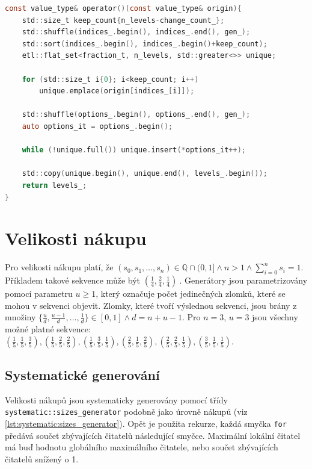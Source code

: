 \begin{lstlisting}[caption={~Metoda pro náhodné generování úrovní nákupu z počátku},label={lst:random:levels:generator:origin},captionpos=t,abovecaptionskip=-\medskipamount,belowcaptionskip=\medskipamount,language=C]
const value_type& operator()(const value_type& origin){
    std::size_t keep_count{n_levels-change_count_};
    std::shuffle(indices_.begin(), indices_.end(), gen_);
    std::sort(indices_.begin(), indices_.begin()+keep_count);
    etl::flat_set<fraction_t, n_levels, std::greater<>> unique;

    for (std::size_t i{0}; i<keep_count; i++)
        unique.emplace(origin[indices_[i]]);

    std::shuffle(options_.begin(), options_.end(), gen_);
    auto options_it = options_.begin();

    while (!unique.full()) unique.insert(*options_it++);

    std::copy(unique.begin(), unique.end(), levels_.begin());
    return levels_;
}
\end{lstlisting}

\section{Velikosti nákupu}
Pro velikosti nákupu platí, že $ (s_0, s_1,\dots,s_n) \in \mathbb{Q} \cap (0, 1] \land n>1 \land \sum_{i=0}^{n} s_i = 1 $.
Příkladem takové sekvence může být $ (\frac{1}{4}, \frac{2}{4}, \frac{1}{4})\ $.
Generátory jsou parametrizovány pomocí parametru $u\geq 1$, který označuje počet jedinečných zlomků, které se mohou v sekvenci objevit.
Zlomky, které tvoří výslednou sekvenci, jsou brány z množiny $\{\frac{u}{d}, \frac{u-1}{d},\dots, \frac{1}{d}\} \in [0, 1] \land d=n+u-1$.
Pro $n=3$, $u=3$ jsou všechny možné platné sekvence: $(\frac{1}{5}, \frac{1}{5}, \frac{3}{5}), (\frac{1}{5}, \frac{2}{5}, \frac{2}{5}), (\frac{1}{5}, \frac{3}{5}, \frac{1}{5}), (\frac{2}{5}, \frac{1}{5}, \frac{2}{5}), (\frac{2}{5}, \frac{2}{5}, \frac{1}{5}), (\frac{3}{5}, \frac{1}{5}, \frac{1}{5})$.

\subsection{Systematické generování}
Velikosti nákupů jsou systematicky generovány pomocí třídy \texttt{systematic::sizes\_generator} podobně jako úrovně nákupů (viz \ref{lst:systematic:sizes_generator}).
Opět je použita rekurze, každá smyčka \texttt{for} předává součet zbývajících čitatelů následující smyčce.
Maximální lokální čitatel má buď hodnotu globálního maximálního čitatele, nebo součet zbývajících čitatelů snížený o 1.


